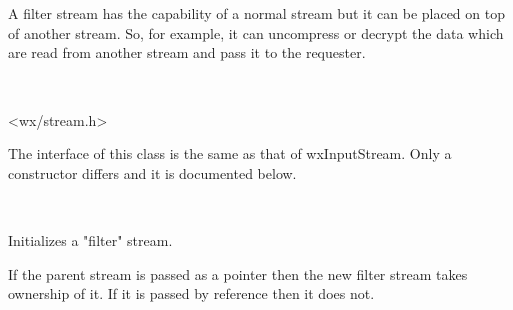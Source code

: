 \section{}\label{wxfilterinputstream}

A filter stream has the capability of a normal stream but it can be placed on top
of another stream. So, for example, it can uncompress or decrypt the data which are read
from another stream and pass it to the requester.


\\


<wx/stream.h>


The interface of this class is the same as that of wxInputStream. Only a constructor
differs and it is documented below.


\\


\label{wxfilterinputstreamctor}



Initializes a "filter" stream.

If the parent stream is passed as a pointer then the new filter stream
takes ownership of it. If it is passed by reference then it does not.

